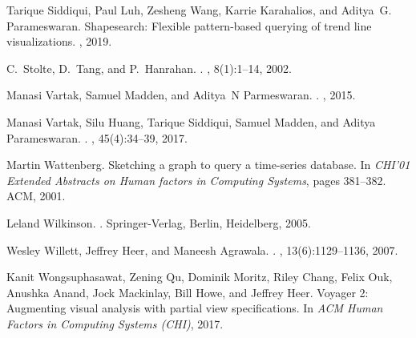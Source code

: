 \documentclass[11pt]{article}
\begin{document}
{\begin{thebibliography}{}
Tarique Siddiqui, Paul Luh, Zesheng Wang, Karrie Karahalios, and Aditya~G.
  Parameswaran.
\newblock Shapesearch: Flexible pattern-based querying of trend line
  visualizations.
, 2019.

C.~Stolte, D.~Tang, and P.~Hanrahan.
.
,
  8(1):1--14, 2002.

Manasi Vartak, Samuel Madden, and Aditya~N Parmeswaran.
.
,
  2015.

Manasi Vartak, Silu Huang, Tarique Siddiqui, Samuel Madden, and Aditya
  Parameswaran.
.
, 45(4):34--39, 2017.

Martin Wattenberg.
\newblock Sketching a graph to query a time-series database.
\newblock In {\em CHI'01 Extended Abstracts on Human factors in Computing
  Systems}, pages 381--382. ACM, 2001.

Leland Wilkinson.
.
\newblock Springer-Verlag, Berlin, Heidelberg, 2005.

Wesley Willett, Jeffrey Heer, and Maneesh Agrawala.
.
,
  13(6):1129--1136, 2007.

Kanit Wongsuphasawat, Zening Qu, Dominik Moritz, Riley Chang, Felix Ouk,
  Anushka Anand, Jock Mackinlay, Bill Howe, and Jeffrey Heer.
\newblock Voyager 2: Augmenting visual analysis with partial view
  specifications.
\newblock In {\em ACM Human Factors in Computing Systems (CHI)}, 2017.


\end{thebibliography}}
\end{document}
